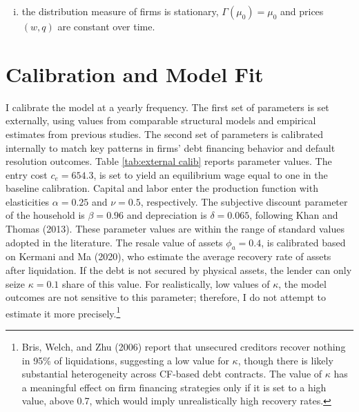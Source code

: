 \documentclass[12pt]{article}
\begin{document}
\begin{enumerate}[(i)]
\begin{multline*}
\end{multline*}
$\Psi$ collects fixed operating and entry costs, as well as default resolution costs, including the deadweight loss from liquidating capital, the costs of debt renegotiation in reorganization, and the loss of current revenues upon default
\begin{multline*} 
\Psi = \int c \, d\mu_0(k,b,\varepsilon) 
+ M \int (1 - \chi_{ex}) \, c_e \, d\Phi(\varepsilon) 
+ \int \chi_d  \chi_l \, \pi(k,\varepsilon) \, d\mu_0(k,b,\varepsilon) \\ 
+ \int \chi_d \, \chi_l \, (1 - \phi_a)(1 - \delta)k \, d\mu_0(k,b,\varepsilon) \\
+ \int \chi_d \, (1 - \chi_l) \left[ \gamma V_{cont}(x,\varepsilon) + \zeta \right] \, d\mu_0(k,b,\varepsilon)
\end{multline*}

\item the distribution measure of firms is stationary, $\Gamma(\mu_0) = \mu_0$ and prices $(w,q)$ are constant over time.
\end{enumerate}


\section{Calibration and Model Fit \label{sec:calibration}}
I calibrate the model at a yearly frequency. The first set of parameters is set externally, using values from comparable structural models and empirical estimates from previous studies. The second set of parameters is calibrated internally to match key patterns in firms' debt financing behavior and default resolution outcomes. Table \ref{tab:external calib} reports parameter values. The entry cost $c_e = 654.3$, is set to yield an equilibrium wage equal to one in the baseline calibration. Capital and labor enter the production function with elasticities $\alpha = 0.25$ and $\nu = 0.5$, respectively. The subjective discount parameter of the household is $\beta = 0.96$ and depreciation is $\delta = 0.065$, following Khan and Thomas (2013). These parameter values are within the range of standard values adopted in the literature. The resale value of assets $\phi_a = 0.4$, is calibrated based on Kermani and Ma (2020), who estimate the average recovery rate of assets after liquidation. If the debt is not secured by physical assets, the lender can only seize $\kappa = 0.1$ share of this value. For realistically, low values of $\kappa$, the model outcomes are not sensitive to this parameter; therefore, I do not attempt to estimate it more precisely.\footnote{Bris, Welch, and Zhu (2006) report that unsecured creditors recover nothing in 95\% of liquidations, suggesting a low value for $\kappa$, though there is likely substantial heterogeneity across CF-based debt contracts. The value of $\kappa$ has a meaningful effect on firm financing strategies only if it is set to a high value, above 0.7, which would imply unrealistically high recovery rates.}
\end{document}
